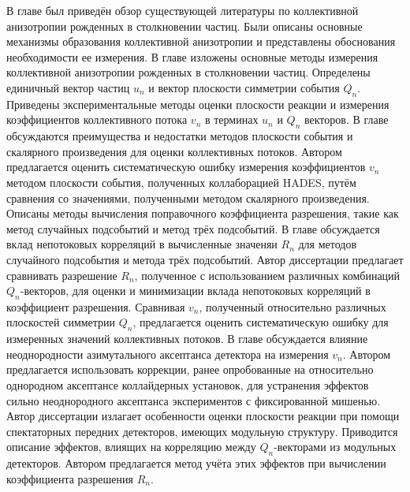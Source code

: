 В главе был приведён обзор существующей литературы по коллективной анизотропии рожденных в столкновении частиц. 
Были описаны основные механизмы образования коллективной анизотропии и представлены обоснования необходимости ее измерения.
В главе изложены основные методы измерения коллективной анизотропии рожденных в столкновении частиц.
Определены единичный вектор частиц $u_n$ и вектор плоскости симметрии события $Q_n$.
Приведены экспериментальные методы оценки плоскости реакции и измерения коэффициентов коллективного потока $v_n$ в терминах $u_n$ и $Q_n$ векторов.
В главе обсуждаются преимущества и недостатки методов плоскости события и скалярного произведения для оценки коллективных потоков. 
Автором предлагается оценить систематическую ошибку измерения коэффициентов $v_n$ методом плоскости события, полученных коллаборацией HADES, путём сравнения со значениями, полученными методом скалярного произведения.
Описаны методы вычисления поправочного коэффициента разрешения, такие как метод случайных подсобытий и метод трёх подсобытий.
В главе обсуждается вклад непотоковых корреляций в вычисленные значеняи $R_n$ для методов случайного подсобытия и метода трёх подсобытий.
Автор диссертации предлагает сравнивать разрешение $R_n$, полученное с использованием различных комбинаций $Q_n$-векторов, для оценки и минимизации вклада непотоковых корреляций в коэффициент разрешения. 
Сравнивая $v_n$, полученный относительно различных плоскостей симметрии $Q_n$, предлагается оценить систематическую ошибку для измеренных значений коллективных потоков. 
В главе обсуждается влияние неоднородности азимутального аксептанса детектора на измерения $v_n$.
Автором предлагается использовать коррекции, ранее опробованные на относительно однородном аксептансе коллайдерных установок, для устранения эффектов сильно неоднородного аксептанса экспериментов с фиксированной мишенью. 
Автор диссертации излагает особенности оценки плоскости реакции при помощи спектаторных передних детекторов, имеющих модульную структуру.
Приводится описание эффектов, влиящих на корреляцию между $Q_n$-векторами из модульных детекторов. 
Автором предлагается метод учёта этих эффектов при вычислении коэффициента разрешения $R_n$.